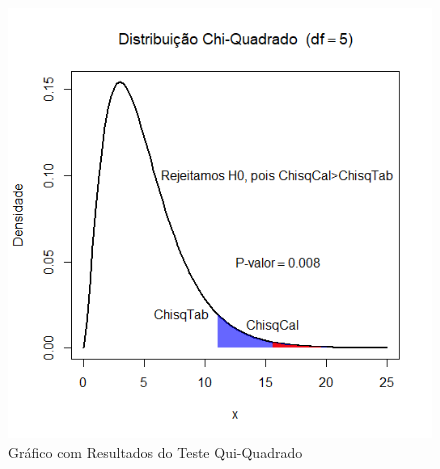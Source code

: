 \documentclass[12pt]{beamer}
\begin{document}
\begin{frame}{}
\begin{block}{}
\begin{figure}
    \centering
    \includegraphics[scale=0.5]{figs/EX1Chisq.png}
    \caption{Gráfico com Resultados do Teste Qui-Quadrado}
    \label{fig:enter-label}
\end{figure}
\end{block}
\end{frame}
\end{document}
